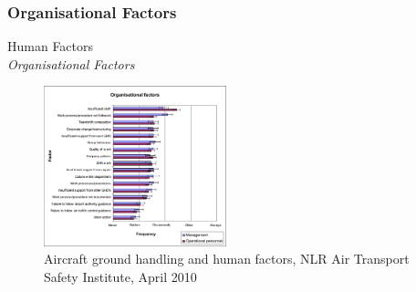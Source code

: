 \subsubsection{Organisational Factors}
\begin{frame}{Human Factors\\\textit{Organisational Factors}}{}
	\begin{figure}[H]
	\centering
	\includegraphics[width=200px]{Grafik/OrganisationalFactors}
	\caption{\footnotesize Aircraft ground handling and human factors, NLR Air Transport Safety Institute, April 2010}
\end{figure}
\end{frame}